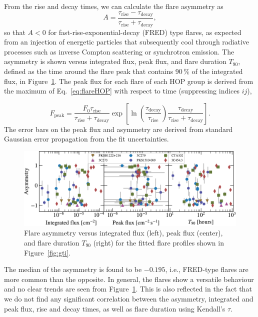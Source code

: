 \documentclass[twocolumn,linenumbers]{aastex62}
\begin{document}
From the rise and decay times, we can calculate the flare asymmetry as
\begin{equation}
    A = \frac{\tau_\mathrm{rise}-\tau_\mathrm{decay}}
    {\tau_\mathrm{rise}+\tau_\mathrm{decay}},
\end{equation}
so that $A < 0$ for fast-rise-exponential-decay (FRED) type flares, as expected from an injection of energetic particles that subsequently cool through radiative processes such as inverse Compton scattering or synchrotron emission.
The asymmetry is shown versus integrated flux, peak flux, and flare duration $T_{90}$, defined as the time around the flare peak that contains 90\,\% of the integrated flux, in Figure~\ref{fig:asym}.
The peak flux for each flare of each HOP group is derived from the maximum of  Eq.~\ref{eq:flareHOP} with respect to time (suppressing indices $ij$),

\begin{equation}
    F_{\mathrm{peak}} = \frac{F_{0} \tau_\mathrm{rise}}{\tau_\mathrm{rise} + \tau_\mathrm{decay}}\exp\left[\ln\left(\frac{\tau_\mathrm{decay}}{\tau_\mathrm{rise}}\right)\frac{\tau_\mathrm{decay}}{\tau_\mathrm{rise} + \tau_\mathrm{decay}}\right].
\end{equation}
The error bars on the peak flux and asymmetry are derived from standard Gaussian error propagation from the fit uncertainties.

\begin{figure}
    \centering
    \includegraphics[width = .8\linewidth]{figures/lcfithop_results_asym_vs_all_orbit_maxiter2_fsys0p00_addcomp0.pdf}
    \caption{Flare asymmetry versus integrated flux (left), peak flux (center), and flare duration $T_{90}$ (right) for the fitted flare profiles shown in Figure~\ref{fig:gti}.}
    \label{fig:asym}
\end{figure}

The median of the asymmetry is found to be $-0.195$, i.e., FRED-type flares are more common than the opposite. In general, the flares show a versatile behaviour and no clear trends are seen from Figure~\ref{fig:asym}. This is also reflected in the fact that we do not find any significant correlation between the asymmetry, integrated and peak flux, rise and decay times, as well as flare duration using Kendall's $\tau$.
\end{document}
